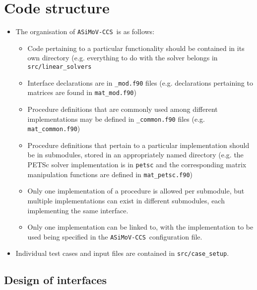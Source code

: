 \documentclass[11pt]{report}
\newcommand{\accs}{\texttt{ASiMoV-CCS}}
\begin{document}
\section{Code structure}
\label{code_structure}
\begin{itemize}
  \item The organisation of \accs\ is as follows:
  \begin{itemize}
    \item Code pertaining to a particular functionality should be contained in its own directory (e.g. everything to do with the solver belongs in \texttt{src/linear\_solvers}
    \item Interface declarations are in \texttt{\_mod.f90} files (e.g. declarations pertaining to matrices are found in \texttt{mat\_mod.f90})
    \item Procedure definitions that are commonly used among different implementations may be defined in \texttt{\_common.f90} files (e.g. \texttt{mat\_common.f90})
    \item Procedure definitions that pertain to a particular implementation should be in submodules, stored in an appropriately named directory (e.g. the PETSc solver implementation is in \texttt{petsc} and the corresponding matrix manipulation functions are defined in \texttt{mat\_petsc.f90})
    \item Only one implementation of a procedure is allowed per submodule, but multiple implementations can exist in different submodules, each implementing the same interface.
    \item Only one implementation can be linked to, with the implementation to be used being specified in the \accs\ configuration file. 
  \end{itemize}
  \item Individual test cases and input files are contained in \texttt{src/case\_setup}.
\end{itemize}

\subsection{Design of interfaces}
\end{document}
